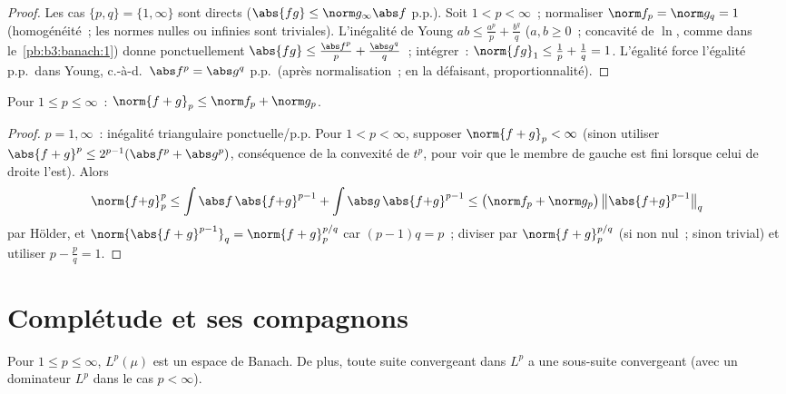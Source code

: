 \begin{proof}
Les cas $\{p, q\} = \{1, \infty\}$ sont directs ($\abs{fg}
\leq \norm g_\infty\abs f$ p.p.). Soit $1 < p < \infty$~;
normaliser $\norm f_p = \norm g_q = 1$ (homogénéité~; les
normes nulles ou infinies sont triviales). L'inégalité de
Young $ab \leq \frac{a^p}p + \frac{b^q}q$ ($a, b \geq 0$~;
concavité de $\ln$, comme dans le~\cref{pb:b3:banach:1})
donne ponctuellement $\abs{f g} \leq \frac{\abs f^p}p +
\frac{\abs g^q}q$~; intégrer~: $\norm{fg}_1 \leq \frac1p +
\frac1q = 1$. L'égalité force l'égalité p.p.\ dans Young,
c.-à-d.\ $\abs f^p = \abs g^q$ p.p.\ (après normalisation~; en
la défaisant, proportionnalité).
\end{proof}

\begin{theorem}\label{thm:b3:lp:minkowski}
Pour $1 \leq p \leq \infty$~: $\norm{f + g}_p \leq \norm f_p
+ \norm g_p$.
\end{theorem}

\begin{proof}
$p = 1, \infty$~: inégalité triangulaire ponctuelle/p.p. Pour
$1 < p < \infty$, supposer $\norm{f+g}_p < \infty$ (sinon
utiliser $\abs{f+g}^p \leq 2^{p-1}(\abs f^p + \abs g^p)$,
conséquence de la convexité de $t^p$, pour voir que le membre
de gauche est fini lorsque celui de droite l'est). Alors
\[
\norm{f{+}g}_p^p \leq \int\abs f\,\abs{f{+}g}^{p-1} +
\int\abs g\,\abs{f{+}g}^{p-1}
\leq \bigl(\norm f_p + \norm g_p\bigr)\,
\bigl\|\abs{f{+}g}^{p-1}\bigr\|_q
\]
par Hölder, et $\norm{\abs{f+g}^{p-1}}_q =
\norm{f+g}_p^{p/q}$ car $(p-1)q = p$~; diviser par
$\norm{f+g}_p^{p/q}$ (si non nul~; sinon trivial) et utiliser
$p - \frac pq = 1$.
\end{proof}

\section{Complétude et ses compagnons}

\begin{theorem}\label{thm:b3:lp:complete}
Pour $1 \leq p \leq \infty$, $L^p(\mu)$ est un espace de
Banach. De plus, toute suite convergeant dans $L^p$ a une
sous-suite convergeant \emph{} (avec un
dominateur $L^p$ dans le cas $p < \infty$).
\end{theorem}

